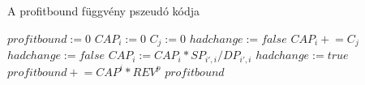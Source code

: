 \begin{algorithm}[H]
\caption{A profitbound függvény pszeudó kódja}
\label{profitbound}
\begin{algorithmic}[1]
	\State $profitbound:= 0$
	\State $CAP_{i}:= 0$
	\State $C_{j}:= 0$
	\State $hadchange:= false$
			\State $CAP_{i} \mathrel{+}= C_{j}$			
		\EndFor
	\EndFor
		\State $hadchange:= false$
					\State $CAP_{i}:= CAP_{i}*SP_{i',i}/DP_{i',i}$
					\State $hadchange:= true$
				\EndIf
			\EndFor	
		\EndFor
	\EndWhile
				\State $profitbound \mathrel{+}= CAP^{i}*REV^{p}$
			\EndIf
		\EndFor
	\EndFor
	\State \Return $profitbound$
\EndProcedure
\end{algorithmic}
\end{algorithm}
